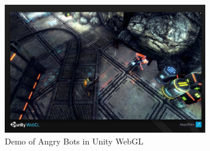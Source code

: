 
    \begin{figure}[htbp]
        \centering
            \includegraphics[width=0.8\textwidth]{03_images/01_angryBots.png}
        \caption{Demo of Angry Bots in Unity WebGL}\label{fig:unity}
    \end{figure}
